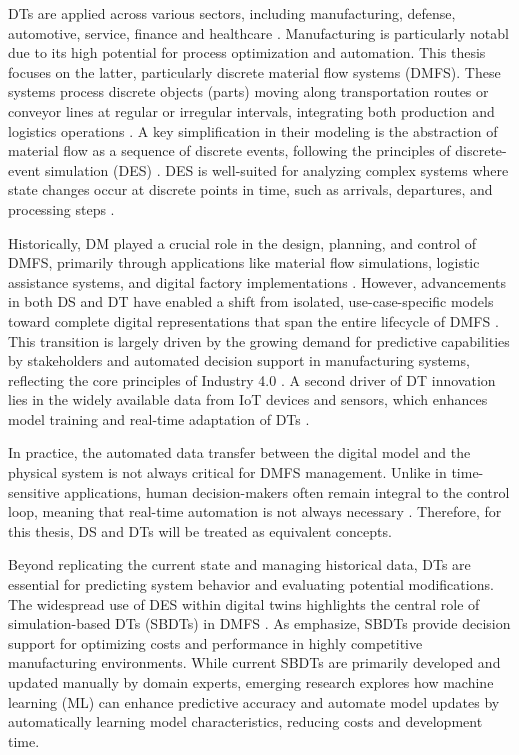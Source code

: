 DTs are applied across various sectors, including manufacturing, defense, automotive, service, finance and healthcare \parencite{Tao2018ijamt}. Manufacturing is particularly notabl due to its high potential for process optimization and automation. This thesis focuses on the latter, particularly discrete material flow systems (DMFS). These systems process discrete objects (parts) moving along transportation routes or conveyor lines at regular or irregular intervals, integrating both production and logistics operations \parencite{arnold2005materialfluss, schwede2024learning}. A key simplification in their modeling is the abstraction of material flow as a sequence of discrete events, following the principles of discrete-event simulation (DES) \parencite{kovacs2016mathematical, robinson2014simulation}. DES is well-suited for analyzing complex systems where state changes occur at discrete points in time, such as arrivals, departures, and processing steps \parencite{robinson2014simulation}.

Historically, DM played a crucial role in the design, planning, and control of DMFS, primarily through applications like material flow simulations, logistic assistance systems, and digital factory implementations \parencite{Thiede2013}. However, advancements in both DS and DT have enabled a shift from isolated, use-case-specific models toward complete digital representations that span the entire lifecycle of DMFS \parencite{Abdoune2023}. This transition is largely driven by the growing demand for predictive capabilities by stakeholders and automated decision support in manufacturing systems, reflecting the core principles of Industry 4.0 \parencite{frank2019industry}. A second driver of DT innovation lies in the widely available data from IoT devices and sensors, which enhances model training and real-time adaptation of DTs \parencite{Tao2018ijamt}.

In practice, the automated data transfer between the digital model and the physical system is not always critical for DMFS management. Unlike in time-sensitive applications, human decision-makers often remain integral to the control loop, meaning that real-time automation is not always necessary \parencite{schwede2024learning}. Therefore, for this thesis, DS and DTs will be treated as equivalent concepts.

Beyond replicating the current state and managing historical data, DTs are essential for predicting system behavior and evaluating potential modifications. The widespread use of DES within digital twins highlights the central role of simulation-based DTs (SBDTs) in DMFS \parencite{Lugaresi2021aifac}. As \citeauthor{schwede2024learning} emphasize, SBDTs provide decision support for optimizing costs and performance in highly competitive manufacturing environments. While current SBDTs are primarily developed and updated manually by domain experts, emerging research explores how machine learning (ML) can enhance predictive accuracy and automate model updates by automatically learning model characteristics, reducing costs and development time.


